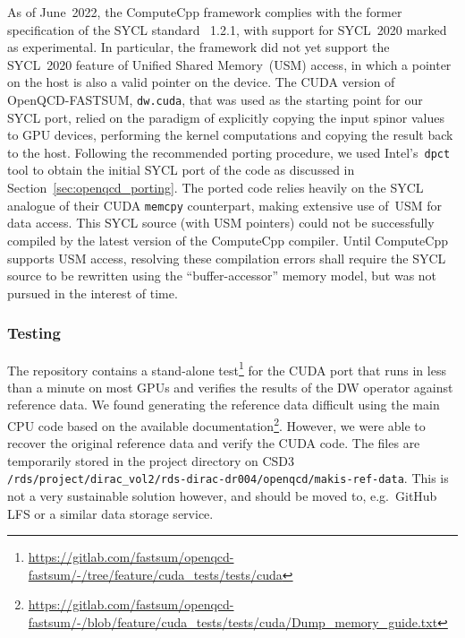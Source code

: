 \documentclass[../main]{subfiles}
\begin{document}
As of June~2022, the ComputeCpp framework complies with the former specification of the SYCL standard \viz~1.2.1, with support for SYCL~2020 marked as experimental.
In particular, the framework did not yet support the SYCL~2020 feature of Unified Shared Memory~(USM) access, in which a pointer on the host is also a valid pointer on the device.
The CUDA version of OpenQCD-FASTSUM, \texttt{dw.cuda}, that was used as the starting point for our SYCL port, relied on the paradigm of explicitly copying the input spinor values to GPU devices, performing the kernel computations and copying the result back to the host.
Following the recommended porting procedure, we used Intel's~\texttt{dpct} tool to obtain the initial SYCL port of the code as discussed in Section~\ref{sec:openqcd_porting}.
The ported code relies heavily on the SYCL analogue of their CUDA \texttt{memcpy} counterpart, making extensive use of~USM for data access.
This SYCL source (with USM pointers) could not be successfully compiled by the latest version of the ComputeCpp compiler.
Until ComputeCpp supports USM access, resolving these compilation errors shall require the SYCL source to be rewritten using the ``buffer-accessor'' memory model, but was not pursued in the interest of time.


\subsubsection{Testing}\label{testing_openqcd}

The repository contains a stand-alone test\footnote{\url{https://gitlab.com/fastsum/openqcd-fastsum/-/tree/feature/cuda_tests/tests/cuda}} for the CUDA port that runs in less than a minute on most GPUs and verifies the results of the DW operator against reference data.
We found generating the reference data difficult using the main CPU code based on the available documentation\footnote{\url{https://gitlab.com/fastsum/openqcd-fastsum/-/blob/feature/cuda_tests/tests/cuda/Dump\_memory\_guide.txt}}.
However, we were able to recover the original reference data and verify the CUDA code.
The files are temporarily stored in the project directory on CSD3 \texttt{/rds/project/dirac\_vol2/rds-dirac-dr004/openqcd/makis-ref-data}.
This is not a very sustainable solution however, and should be moved to, e.g.\ GitHub LFS or a similar data storage service.
\end{document}
